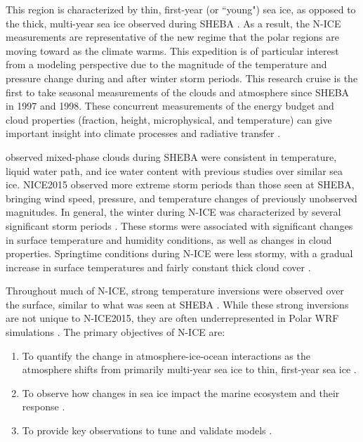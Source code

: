 This region is characterized by thin, first-year (or ``young") sea ice, as opposed to the thick, multi-year sea ice observed during SHEBA \citep{cohen:2017}. As a result, the N-ICE measurements are representative of the new regime that the polar regions are moving toward as the climate warms. This expedition is of particular interest from a modeling perspective due to the magnitude of the temperature and pressure change during and after winter storm periods. This research cruise is the first to take seasonal measurements of the clouds and atmosphere since SHEBA in 1997 and 1998. These concurrent measurements of the energy budget and cloud properties (fraction, height, microphysical, and temperature) can give important insight into climate processes and radiative transfer \citep{persson:2002, schweiger:2004}. 

\citet{shupe:2004} observed mixed-phase clouds during SHEBA were consistent in temperature, liquid water path, and ice water content with previous studies over similar sea ice. NICE2015 observed more extreme storm periods than those seen at SHEBA, bringing wind speed, pressure, and temperature changes of previously unobserved magnitudes. In general, the winter during N-ICE was characterized by several significant storm periods \citep{cohen:2017}. These storms were associated with significant changes in surface temperature and humidity conditions, as well as changes in cloud properties. Springtime conditions during N-ICE were less stormy, with a gradual increase in surface temperatures and fairly constant thick cloud cover \citep{cohen:2017}.

Throughout much of N-ICE, strong temperature inversions were observed over the surface, similar to what was seen at SHEBA \citep{kayser:2017}. While these strong inversions are not unique to N-ICE2015, they are often underrepresented in Polar WRF simulations \citep{hines:2015}. 
\newline 
\noindent The primary objectives of N-ICE are:
\begin{enumerate}
    \item To quantify the change in atmosphere-ice-ocean interactions as the atmosphere shifts from primarily multi-year sea ice to thin, first-year sea ice \citep{granskog:2018, granskog:2015}. 
    \item To observe how changes in sea ice impact the marine ecosystem and their response \citep{granskog:2015}.
    \item To provide key observations to tune and validate models \citep{granskog:2018, granskog:2015}.
\end{enumerate}


